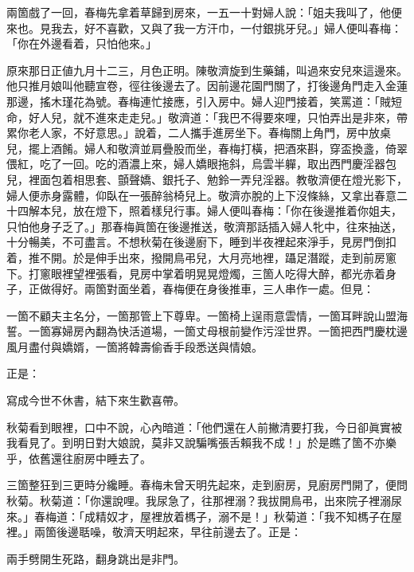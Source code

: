 兩箇戲了一回，春梅先拿着草歸到房來，一五一十對婦人說：「姐夫我叫了，他便來也。見我去，好不喜歡，又與了我一方汗巾，一付銀挑牙兒。」婦人便叫春梅：「你在外邊看着，只怕他來。」

原來那日正値九月十二三，月色正明。陳敬濟旋到生藥鋪，叫過來安兒來這邊來。他只推月娘叫他聽宣卷，徑往後邊去了。因前邊花園門關了，打後邊角門走入金蓮那邊，搖木瑾花為號。春梅連忙接應，引入房中。婦人迎門接着，笑罵道：「賊短命，好人兒，就不進來走走兒。」敬濟道：「我巴不得要來哩，只怕弄出是非來，帶累你老人家，不好意思。」說着，二人攜手進房坐下。春梅關上角門，房中放桌兒，擺上酒餚。婦人和敬濟並肩疊股而坐，春梅打橫，把酒來斟，穿盃換盞，倚翠偎紅，吃了一回。吃的酒濃上來，婦人嬌眼拖斜，烏雲半軃，取出西門慶淫器包兒，裡面包着相思套、顫聲嬌、銀托子、勉鈴一弄兒淫器。{}教敬濟便在燈光影下，婦人便赤身露體，仰臥在一張醉翁椅兒上。敬濟亦脫的上下沒條絲，又拿出春意二十四解本兒，放在燈下，照着樣兒行事。婦人便叫春梅：「你在後邊推着你姐夫，只怕他身子乏了。」那春梅眞箇在後邊推送，敬濟那話插入婦人牝中，往來抽送，十分暢美，不可盡言。不想秋菊在後邊廚下，睡到半夜裡起來淨手，見房門倒扣着，推不開。於是伸手出來，撥開鳥弔兒，大月亮地裡，躡足潛蹤，走到前房窻下。打窻眼裡望裡張看，見房中掌着明晃晃燈燭，三箇人吃得大醉，都光赤着身子，正做得好。兩箇對面坐着，春梅便在身後推車，三人串作一處。{}但見：

\begin{myquote}
一箇不顧夫主名分，一箇那管上下尊卑。一箇椅上逞雨意雲情，一箇耳畔說山盟海誓。一箇寡婦房內翻為快活道場，一箇丈母根前變作污淫世界。一箇把西門慶枕邊風月盡付與嬌婿，一箇將韓壽偷香手段悉送與情娘。
\end{myquote}

正是：

\begin{myquote}
寫成今世不休書，結下來生歡喜帶。
\end{myquote}

秋菊看到眼裡，口中不說，心內暗道：「他們還在人前撇清要打我，今日卻眞實被我看見了。到明日對大娘說，莫非又說騙嘴張舌賴我不成！」{}於是瞧了箇不亦樂乎，依舊還往廚房中睡去了。

三箇整狂到三更時分纔睡。春梅未曾天明先起來，走到廚房，見廚房門開了，便問秋菊。秋菊道：「你還說哩。我尿急了，往那裡溺？我拔開鳥弔，出來院子裡溺尿來。」{}春梅道：「成精奴才，屋裡放着榪子，溺不是！」秋菊道：「我不知榪子在屋裡。」兩箇後邊聒噪，敬濟天明起來，早往前邊去了。正是：

\begin{myquote}
兩手劈開生死路，翻身跳出是非門。
\end{myquote}

